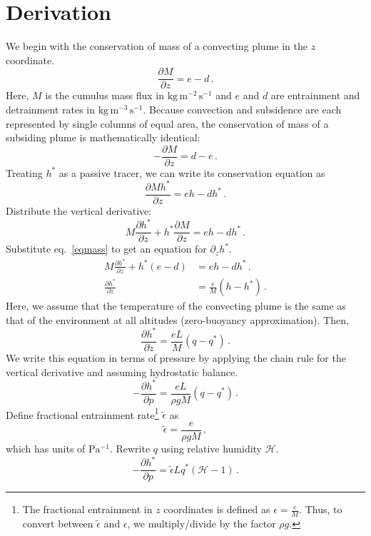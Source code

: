 \documentclass{article}
\begin{document}
\section{Derivation}
We begin with the conservation of mass of a convecting plume in the $z$ coordinate.
\begin{equation}
\label{eqmass}
\frac{\partial M}{\partial z} = e - d \, .
\end{equation}
Here, $M$ is the cumulus mass flux in $\mathrm{kg\,m^{-2}\,s^{-1}}$ and $e$ and $d$ are entrainment and detrainment rates in $\mathrm{kg\,m^{-3}\,s^{-1}}$. Because convection and subsidence are each represented by single columns of equal area, the conservation of mass of a subsiding plume is mathematically identical:
\begin{equation}
-\frac{\partial M}{\partial z} = d - e \, .
\end{equation}
Treating $h^*$ as a passive tracer, we can write its conservation equation as
\begin{equation}
\frac{\partial Mh^*}{\partial z} = eh - dh^* \, .
\end{equation}
Distribute the vertical derivative:
\begin{equation}
M\frac{\partial h^*}{\partial z} + h^*\frac{\partial M}{\partial z} = eh - dh^* \, .
\end{equation}
Substitute eq.~\ref{eqmass} to get an equation for $\partial_z h^*$.
\begin{align}
M\frac{\partial h^*}{\partial z} + h^*(e - d) &= eh - dh^* \, . \\
\frac{\partial h^*}{\partial z} &= \frac{e}{M}(h - h^*) \, . 
\end{align}
Here, we assume that the temperature of the convecting plume is the same as that of the environment at all altitudes (zero-buoyancy approximation). Then,
\begin{equation}
\frac{\partial h^*}{\partial z} = \frac{eL}{M}(q - q^*) \, .
\end{equation}
We write this equation in terms of pressure by applying the chain rule for the vertical derivative and assuming hydrostatic balance. 
\begin{equation}
-\frac{\partial h^*}{\partial p} = \frac{eL}{\rho gM}(q - q^*) \, . 
\end{equation}
Define fractional entrainment rate\footnote{The fractional entrainment in $z$ coordinates is defined as $\epsilon = \frac{e}{M}$. Thus, to convert between $\tilde{\epsilon}$ and $\epsilon$, we multiply/divide by the factor $\rho g$.} $\tilde{\epsilon}$ as
\begin{equation}
\tilde{\epsilon} = \frac{e}{\rho gM} \, ,
\end{equation}
which has units of $\mathrm{Pa^{-1}}$. Rewrite $q$ using relative humidity $\mathcal{H}$.
\begin{equation}
\label{eqh1}
-\frac{\partial h^*}{\partial p} = \tilde{\epsilon}Lq^*(\mathcal{H} - 1) \, .
\end{equation}
\end{document}
